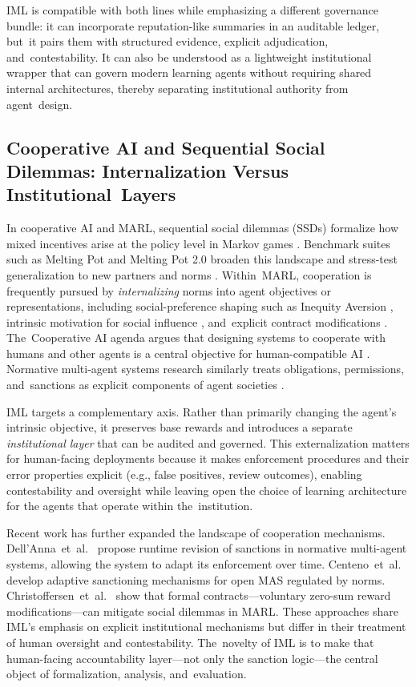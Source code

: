 \documentclass[mca,article,accept,pdftex,oneauthor]{Definitions/mdpi}
\begin{document}
IML is compatible with both lines while emphasizing a different governance bundle: it can incorporate reputation-like summaries in an auditable ledger, but~it pairs them with structured evidence, explicit adjudication, and~contestability. It can also be understood as a lightweight institutional wrapper that can govern modern learning agents without requiring shared internal architectures, thereby separating institutional authority from agent~design.

\subsection{Cooperative AI and Sequential Social Dilemmas: Internalization Versus Institutional~Layers}

In cooperative AI and MARL, sequential social dilemmas (SSDs) formalize how mixed incentives arise at the policy level in Markov games \citep{Leibo2017SSD}. Benchmark suites such as Melting Pot and Melting Pot 2.0 broaden this landscape and stress-test generalization to new partners and norms \citep{Leibo2021MeltingPot,Agapiou2022MeltingPot2}. Within~MARL, cooperation is frequently pursued by \emph{internalizing} norms into agent objectives or representations, including social-preference shaping such as Inequity Aversion \citep{Hughes2018InequityAversion}, intrinsic motivation for social influence \citep{Jaques2019SocialInfluence}, and~explicit contract modifications \citep{Haupt2023Contracts}. The~Cooperative AI agenda argues that designing systems to cooperate with humans and other agents is a central objective for human-compatible AI \citep{Dafoe2020CooperativeAI}. Normative multi-agent systems research similarly treats obligations, permissions, and~sanctions as explicit components of agent societies \citep{Boella2006NormativeMAS}.

IML targets a complementary axis. Rather than primarily changing the agent's intrinsic objective, it preserves base rewards and introduces a separate \emph{institutional layer} that can be audited and governed. This externalization matters for human-facing deployments because it makes enforcement procedures and their error properties explicit (e.g., false positives, review outcomes), enabling contestability and oversight while leaving open the choice of learning architecture for the agents that operate within the~institution.

Recent work has further expanded the landscape of cooperation mechanisms. Dell'Anna~et~al.~\citep{DellAnna2020Runtime} propose runtime revision of sanctions in normative multi-agent systems, allowing the system to adapt its enforcement over time. Centeno~et~al.~\citep{Centeno2011Adaptive} develop adaptive sanctioning mechanisms for open MAS regulated by norms. Christoffersen~et~al.~\citep{Christoffersen2024Contracts} show that formal contracts---voluntary zero-sum reward modifications---can mitigate social dilemmas in MARL. These approaches share IML's emphasis on explicit institutional mechanisms but differ in their treatment of human oversight and contestability. The~novelty of IML is to make that human-facing accountability layer---not only the sanction logic---the central object of formalization, analysis, and~evaluation.
\end{document}
